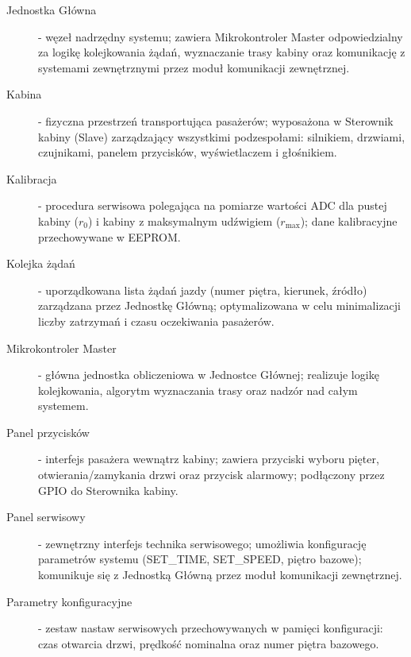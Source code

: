 \documentclass[a4paper,12pt]{article}
\begin{document}
\begin{description}


  \item[Jednostka Główna] - węzeł nadrzędny systemu; zawiera Mikrokontroler Master odpowiedzialny za logikę kolejkowania żądań, wyznaczanie trasy kabiny oraz komunikację z systemami zewnętrznymi przez moduł komunikacji zewnętrznej.

  \item[Kabina] - fizyczna przestrzeń transportująca pasażerów; wyposażona w Sterownik kabiny (Slave) zarządzający wszystkimi podzespołami: silnikiem, drzwiami, czujnikami, panelem przycisków, wyświetlaczem i głośnikiem.

  \item[Kalibracja] - procedura serwisowa polegająca na pomiarze wartości ADC dla pustej kabiny ($r_0$) i kabiny z maksymalnym udźwigiem ($r_\text{max}$); dane kalibracyjne przechowywane w EEPROM.

  \item[Kolejka żądań] - uporządkowana lista żądań jazdy (numer piętra, kierunek, źródło) zarządzana przez Jednostkę Główną; optymalizowana w celu minimalizacji liczby zatrzymań i czasu oczekiwania pasażerów.

  \item[Mikrokontroler Master] - główna jednostka obliczeniowa w Jednostce Głównej; realizuje logikę kolejkowania, algorytm wyznaczania trasy oraz nadzór nad całym systemem.

  \item[Panel przycisków] - interfejs pasażera wewnątrz kabiny; zawiera przyciski wyboru pięter, otwierania/zamykania drzwi oraz przycisk alarmowy; podłączony przez GPIO do Sterownika kabiny.

  \item[Panel serwisowy] - zewnętrzny interfejs technika serwisowego; umożliwia konfigurację parametrów systemu (SET\_TIME, SET\_SPEED, piętro bazowe); komunikuje się z Jednostką Główną przez moduł komunikacji zewnętrznej.

  \item[Parametry konfiguracyjne] - zestaw nastaw serwisowych przechowywanych w pamięci konfiguracji: czas otwarcia drzwi, prędkość nominalna oraz numer piętra bazowego.


\end{description}
\end{document}
